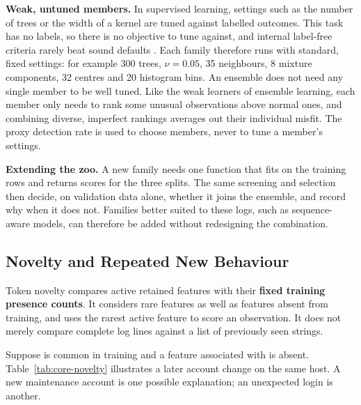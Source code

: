 \documentclass[11pt,a4paper]{article}
\newcommand{\tok}[1]{\texttt{\detokenize{#1}}}
\begin{document}
\textbf{Weak, untuned members.} In supervised learning, settings such as the number of trees or the width of a kernel are tuned against labelled outcomes. This task has no labels, so there is no objective to tune against, and internal label-free criteria rarely beat sound defaults \cite{ref16}. Each family therefore runs with standard, fixed settings: for example 300 trees, \(\nu=0.05\), 35 neighbours, 8 mixture components, 32 centres and 20 histogram bins. An ensemble does not need any single member to be well tuned. Like the weak learners of ensemble learning, each member only needs to rank some unusual observations above normal ones, and combining diverse, imperfect rankings averages out their individual misfit. The proxy detection rate is used to choose members, never to tune a member's settings.

\textbf{Extending the zoo.} A new family needs one function that fits on the training rows and returns scores for the three splits. The same screening and selection then decide, on validation data alone, whether it joins the ensemble, and record why when it does not. Families better suited to these logs, such as sequence-aware models, can therefore be added without redesigning the combination.

\subsection{Novelty and Repeated New Behaviour}\label{sec:core-novelty}

Token novelty compares active retained features with their \textbf{fixed training presence counts}. It considers rare features as well as features absent from training, and uses the rarest active feature to score an observation. It does not merely compare complete log lines against a list of previously seen strings.

Suppose \tok{backup} is common in training and a feature associated with \tok{maint1} is absent. Table~\ref{tab:core-novelty} illustrates a later account change on the same host. A new maintenance account is one possible explanation; an unexpected login is another.
\end{document}
